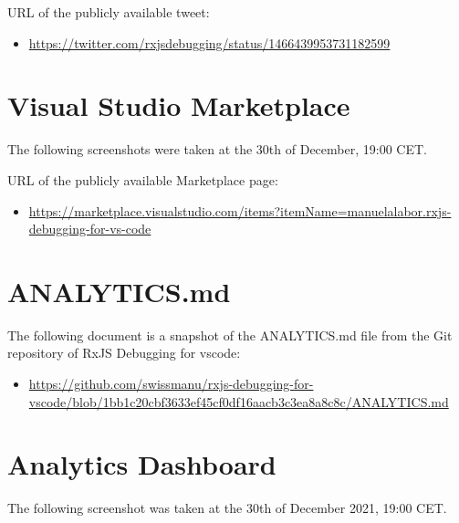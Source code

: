 URL of the publicly available tweet:

\begin{itemize}
  \item \url{https://twitter.com/rxjsdebugging/status/1466439953731182599}
\end{itemize}







\section{Visual Studio Marketplace}
\label{sec:marketplace}
The following screenshots were taken at the 30th of December, 19:00 CET.

URL of the publicly available Marketplace page:

\begin{itemize}
  \item \url{https://marketplace.visualstudio.com/items?itemName=manuelalabor.rxjs-debugging-for-vs-code}
\end{itemize}





\section{ANALYTICS.md}
\label{sec:analytics}
The following document is a snapshot of the ANALYTICS.md file from the Git repository of RxJS Debugging for vscode:

\begin{itemize}
  \item \url{https://github.com/swissmanu/rxjs-debugging-for-vscode/blob/1bb1c20cbf3633ef45cf0df16aacb3c3ea8a8c8c/ANALYTICS.md}
\end{itemize}






\section{Analytics Dashboard}
\label{sec:analytics-dashboard}
The following screenshot was taken at the 30th of December 2021, 19:00 CET.


